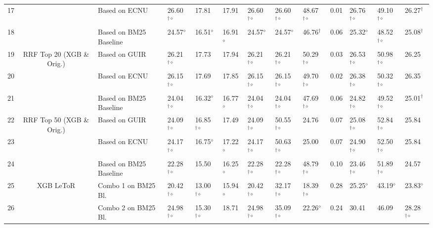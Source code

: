 \begin{table*}
{\begin{tabular}{cclllllllllll}
17  &  & Based on ECNU  & 26.60$^{\dagger\diamond}$  & 17.81  & 17.91  & 26.60$^{\dagger\diamond}$  & 26.60$^{\dagger\diamond}$  & 48.67$^{\dagger\diamond}$  & 0.01  & 26.76$^{\dagger\diamond}$  & 49.10$^{\dagger\diamond}$  & 26.27$^{\dagger}$ \tabularnewline
18  &  & Based on BM25 Baseline  & 24.57$^{\diamond}$  & 16.51$^{\diamond}$  & 16.91$^{\diamond}$  & 24.57$^{\diamond}$  & 24.57$^{\diamond}$  & 46.76$^{\dagger}$  & 0.06  & 25.32$^{\diamond}$  & 48.52$^{\dagger\diamond}$  & 25.08$^{\dagger}$ \tabularnewline
\midrule 
19  & \multirow{3}{*}{RRF Top 20 (XGB \& Orig.)} & Based on GUIR  & 26.21$^{\dagger\diamond}$  & 17.73  & 17.94  & 26.21$^{\dagger\diamond}$  & 26.21$^{\dagger\diamond}$  & 50.29$^{\dagger\diamond}$  & 0.03  & 26.53$^{\dagger\diamond}$  & 50.98$^{\dagger\diamond}$  & 26.25\tabularnewline
20  &  & Based on ECNU  & 26.15$^{\dagger\diamond}$  & 17.69  & 17.85  & 26.15$^{\dagger\diamond}$  & 26.15$^{\dagger\diamond}$  & 49.70$^{\dagger\diamond}$  & 0.02  & 26.38$^{\dagger\diamond}$  & 50.32$^{\dagger\diamond}$  & 26.35\tabularnewline
21  &  & Based on BM25 Baseline  & 24.04$^{\dagger\diamond}$  & 16.32$^{\diamond}$  & 16.77$^{\diamond}$  & 24.04$^{\dagger\diamond}$  & 24.04$^{\dagger\diamond}$  & 47.69$^{\dagger\diamond}$  & 0.06  & 24.82$^{\dagger\diamond}$  & 49.52$^{\dagger\diamond}$  & 25.01$^{\dagger}$ \tabularnewline
\midrule 
22  & \multirow{3}{*}{RRF Top 50 (XGB \& Orig.)} & Based on GUIR  & 24.09$^{\dagger\diamond}$  & 16.85$^{\dagger\diamond}$  & 17.49  & 24.09$^{\dagger\diamond}$  & 50.55$^{\dagger\diamond}$  & 24.76  & 0.07  & 25.08$^{\dagger\diamond}$  & 52.84$^{\dagger\diamond}$  & 25.84\tabularnewline
23  &  & Based on ECNU  & 24.17$^{\dagger\diamond}$  & 16.75$^{\diamond}$  & 17.22$^{\diamond}$  & 24.17$^{\dagger\diamond}$  & 50.63$^{\dagger\diamond}$  & 25.00  & 0.07  & 24.90$^{\dagger\diamond}$  & 52.50$^{\dagger\diamond}$  & 25.84 \tabularnewline
24  &  & Based on BM25 Baseline  & 22.28$^{\dagger\diamond}$  & 15.50  & 16.25$^{\diamond}$  & 22.28$^{\dagger\diamond}$  & 22.28$^{\dagger\diamond}$  & 48.79$^{\dagger\diamond}$  & 0.10  & 23.46$^{\dagger\diamond}$  & 51.89$^{\dagger\diamond}$  & 24.57\tabularnewline
\midrule 
25  & \multirow{5}{*}{XGB LeToR} & Combo 1 on BM25 Bl.  & 20.42$^{\dagger\diamond}$  & 13.00$^{\dagger\diamond}$  & 15.94$^{\diamond}$  & 20.42$^{\dagger\diamond}$  & 32.17$^{\dagger\diamond}$  & 18.39$^{\dagger\diamond}$  & 0.28  & 25.25$^{\diamond}$  & 43.19$^{\diamond}$  & 23.83$^{\diamond}$\tabularnewline
26  &  & Combo 2 on BM25 Bl.  & 24.98$^{\dagger\diamond}$  & 15.30$^{\dagger\diamond}$  & 18.71  & 24.98$^{\dagger\diamond}$  & 35.09$^{\dagger\diamond}$  & 22.26$^{\diamond}$   & 0.24 & 30.41  & 46.09  & 28.28$^{\dagger\diamond}$ \tabularnewline

\end{tabular}}
\end{table*}

